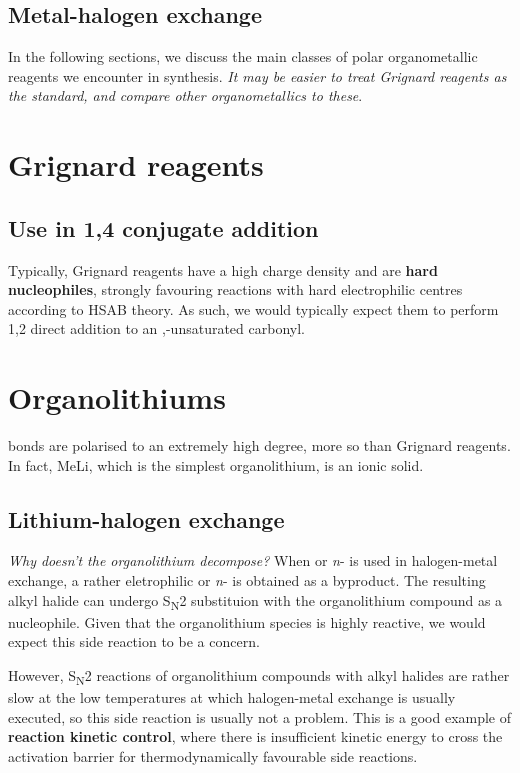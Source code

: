 \documentclass{article} %
\theoremstyle{definition}
\begin{document}
\subsection*{Metal-halogen exchange}

In the following sections, we discuss the main classes of polar organometallic reagents
we encounter in synthesis. \textit{It may be easier to treat Grignard reagents as the
standard, and compare other organometallics to these}.

\section{Grignard reagents}

\subsection{Use in 1,4 conjugate addition}

Typically, Grignard reagents have a high charge density and are \textbf{hard nucleophiles},
strongly favouring reactions with hard electrophilic centres according to HSAB theory. As such,
we would typically expect them to perform 1,2 direct addition to an \textalpha,\textbeta-unsaturated
carbonyl.

\section{Organolithiums}

 bonds are polarised to an extremely high degree, more so than Grignard reagents.
In fact, MeLi, which is the simplest organolithium, is an ionic solid.

\subsection{Lithium-halogen exchange}

\textit{Why doesn't the organolithium decompose?} When  or \textit{n}- is
used in halogen-metal exchange, a rather eletrophilic  or \textit{n}- is obtained
as a byproduct. The resulting alkyl halide can undergo S\textsubscript{N}2 substituion with the
organolithium compound as a nucleophile. Given that the organolithium species is highly reactive,
we would expect this side reaction to be a concern.

However, S\textsubscript{N}2 reactions of organolithium compounds with alkyl halides are rather
slow at the low temperatures at which halogen-metal exchange is usually executed, so this side
reaction is usually not a problem. This is a good example of \textbf{reaction kinetic control}, 
where there is insufficient kinetic energy to cross the activation barrier for thermodynamically
favourable side reactions.
\end{document}
